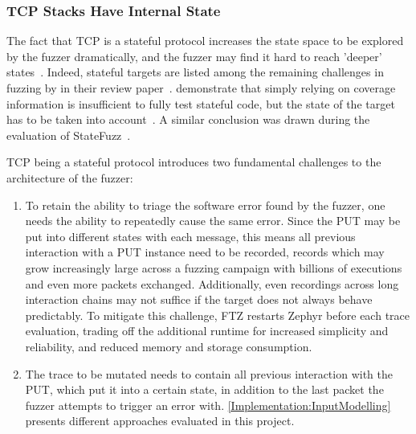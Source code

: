 \documentclass[twocolumn]{article}
\newcommand{\proj}{FTZ\xspace}
\let\savedCite=\cite
\renewcommand{\cite}{\unskip~\savedCite}
\begin{document}
\subsubsection{TCP Stacks Have Internal State}
\label{Background:TcpIsStateful}

The fact that TCP is a stateful protocol increases the state space to be explored by the fuzzer dramatically, and the fuzzer may find it hard to reach 'deeper' states\cite{StatefulReview}. Indeed, stateful targets are listed among the remaining challenges in fuzzing by \citeauthor{ChallengesAndReflections} in their review paper\cite{ChallengesAndReflections}. \citeauthor{SGFuzz} demonstrate that simply relying on coverage information is insufficient to fully test stateful code, but the state of the target has to be taken into account\cite{SGFuzz}. A similar conclusion was drawn during the evaluation of StateFuzz\cite{StateFuzz}.

TCP being a stateful protocol introduces two fundamental challenges to the architecture of the fuzzer:
\begin{enumerate}
  \item To retain the ability to triage the software error found by the fuzzer, one needs the ability to repeatedly cause the same error. Since the PUT may be put into different states with each message, this means all previous interaction with a PUT instance need to be recorded, records which may grow increasingly large across a fuzzing campaign with billions of executions and even more packets exchanged. Additionally, even recordings across long interaction chains may not suffice if the target does not always behave predictably. To mitigate this challenge, \proj restarts Zephyr before each trace evaluation, trading off the additional runtime for increased simplicity and reliability, and reduced memory and storage consumption.
  \item The trace to be mutated needs to contain all previous interaction with the PUT, which put it into a certain state, in addition to the last packet the fuzzer attempts to trigger an error with. \cref{Implementation:InputModelling} presents different approaches evaluated in this project.
\end{enumerate}
\end{document}
